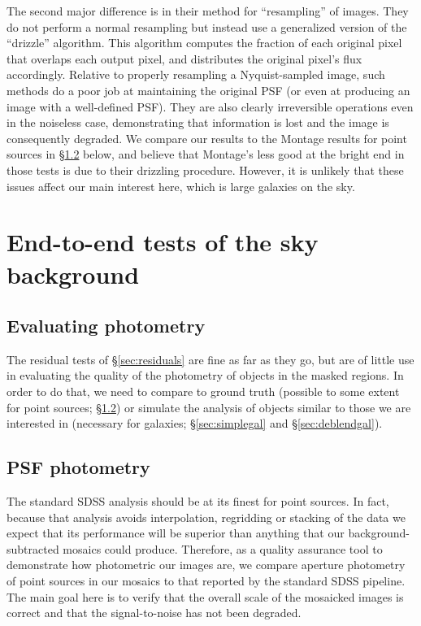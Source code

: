 \documentclass[10pt,preprint]{aastex}
\begin{document}
The second major difference is in their method for ``resampling'' of
images. They do not perform a normal resampling but instead use a
generalized version of the ``drizzle'' algorithm. This algorithm
computes the fraction of each original pixel that overlaps each output
pixel, and distributes the original pixel's flux accordingly. Relative
to properly resampling a Nyquist-sampled image, such methods do a poor
job at maintaining the original PSF (or even at producing an image
with a well-defined PSF). They are also clearly irreversible
operations even in the noiseless case, demonstrating that information
is lost and the image is consequently degraded. We compare our results
to the Montage results for point sources in \S\ref{sec:psfs} below,
and believe that Montage's less good at the bright end in those tests
is due to their drizzling procedure. However, it is unlikely that
these issues affect our main interest here, which is large galaxies on
the sky.

\section{End-to-end tests of the sky background}
\label{sec:endtoend}

\subsection{Evaluating photometry}
\label{sec:e2eintro}

The residual tests of \S\ref{sec:residuals} are fine as far as they go,
but are of little use in evaluating the quality of the photometry of
objects in the masked regions.  In order to do that, we need to
compare to ground truth (possible to some extent for point sources;
\S\ref{sec:psfs}) or simulate the analysis of objects similar to
those we are interested in (necessary for galaxies;
\S\ref{sec:simplegal} and \S\ref{sec:deblendgal}).

\subsection{PSF photometry}
\label{sec:psfs}

The standard SDSS analysis should be at its finest for point sources.
In fact, because that analysis avoids interpolation, regridding or
stacking of the data we expect that its performance will be superior
than anything that our background-subtracted mosaics could
produce. Therefore, as a quality assurance tool to demonstrate how
photometric our images are, we compare aperture photometry of point
sources in our mosaics to that reported by the standard SDSS
pipeline. The main goal here is to verify that the overall scale of
the mosaicked images is correct and that the signal-to-noise has not
been degraded.
\end{document}
